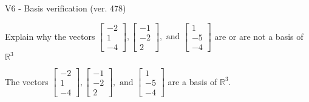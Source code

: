 \begin{exercise}
  \begin{exerciseTitle}V6 - Basis verification (ver. 478)\end{exerciseTitle}
  \begin{exerciseStatement}
    Explain why the vectors \(\left[\begin{array}{r}
-2 \\
1 \\
-4
\end{array}\right] , \left[\begin{array}{r}
-1 \\
-2 \\
2
\end{array}\right] , \text{ and } \left[\begin{array}{r}
1 \\
-5 \\
-4
\end{array}\right]\) are or are not a basis of \(\mathbb{R}^3\)	


  \end{exerciseStatement}
  \begin{exerciseAnswer}
   The vectors \(\left[\begin{array}{r}
-2 \\
1 \\
-4
\end{array}\right] , \left[\begin{array}{r}
-1 \\
-2 \\
2
\end{array}\right] , \text{ and } \left[\begin{array}{r}
1 \\
-5 \\
-4
\end{array}\right]\) 
  	 are  a basis of \(\mathbb{R}^3\).
  


  \end{exerciseAnswer}
\end{exercise}